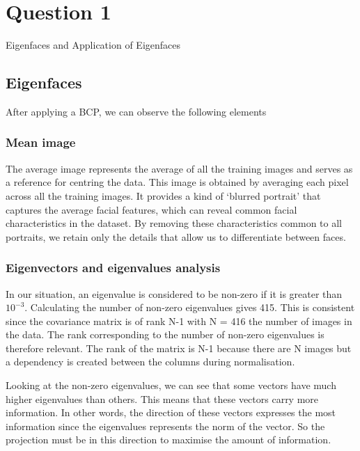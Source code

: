 
\vspace{-2em}
\section{Question 1} Eigenfaces and Application of Eigenfaces
\newline


\subsection{Eigenfaces}
After applying a BCP, we can observe the following elements
\subsubsection{Mean image}

The average image represents the average of all the training images and serves as a reference for centring the data. This image is obtained by averaging each pixel across all the training images. It provides a kind of ‘blurred portrait’ that captures the average facial features, which can reveal common facial characteristics in the dataset. By removing these characteristics common to all portraits, we retain only the details that allow us to differentiate between faces.

\subsubsection{Eigenvectors and eigenvalues analysis}

In our situation, an eigenvalue is considered to be non-zero if it is greater than $10^{-3}$. Calculating the number of non-zero eigenvalues gives 415. This is consistent since the covariance matrix is of rank N-1 with N = 416 the number of images in the data. The rank corresponding to the number of non-zero eigenvalues is therefore relevant. The rank of the matrix is N-1 because there are N images but a dependency is created between the columns during normalisation.
\newline

Looking at the non-zero eigenvalues, we can see that some vectors have much higher eigenvalues than others. This means that these vectors carry more information. In other words, the direction of these vectors expresses the most information since the eigenvalues represents the norm of the vector. So the projection must be in this direction to maximise the amount of information.
\newline

